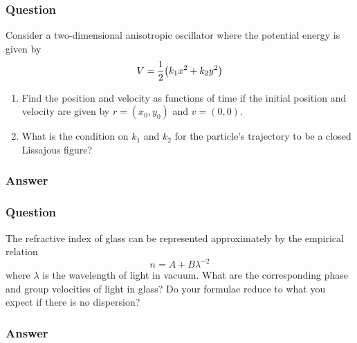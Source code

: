 \subsubsection{Question}
Consider a two-dimensional anisotropic oscillator where the potential energy is given by
\begin{equation*}
	V= \frac{1}{2}\qty(k_1x^2+k_2y^2)
\end{equation*}
\begin{enumerate}
	\item Find the position and velocity as functions of time if the initial position and velocity are given by $r = (x_0, y_0)$ and $v = (0, 0)$.
	\item What is the condition on $k_1$ and $k_2$ for the particle’s trajectory to be a closed Lissajous figure?
\end{enumerate}
\subsubsection{Answer}



\subsubsection{Question}
The refractive index of glass can be represented approximately by the empirical relation
\begin{equation}
	n = A + B\lambda^{-2}
\end{equation}
where $\lambda$ is the wavelength of light in vacuum. What are the corresponding phase and group velocities of light in glass? Do your formulae reduce to what you expect if there is no dispersion?
\subsubsection{Answer}


